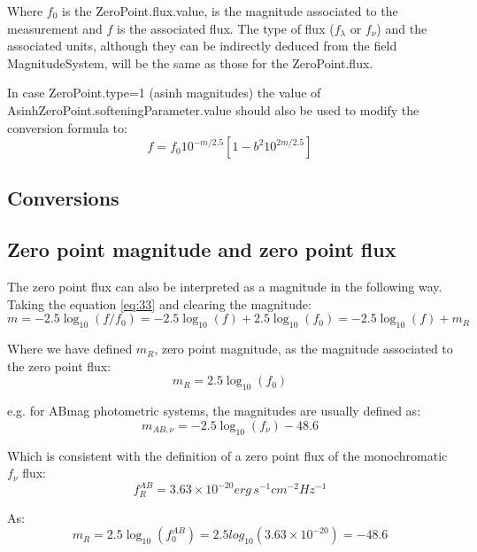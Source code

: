 \documentclass[11pt,a4paper]{ivoa}
\begin{document}
Where $f_0$ is the ZeroPoint.flux.value, is the magnitude associated to the 
measurement and $f$ is the associated flux. The type of flux ($f_\lambda $ or $f_\nu $) 
and the associated units, although they can be indirectly deduced from the field 
MagnitudeSystem, will be the same as those for the ZeroPoint.flux.
\par
In case ZeroPoint.type=1 (asinh magnitudes) the value of 
AsinhZeroPoint.softeningParameter.value should also be used to modify the conversion 
formula to:
\begin{equation} \label{eq:34}
f = f_0 10^{-m/2.5}\left[ 1 - b^2 10^{2m/2.5}\right]
\end{equation}

\begin{appendices}
\section{Conversions}
\subsection{Zero point magnitude and zero point flux} \label{a.1conversion}
The zero point flux can also be interpreted as a magnitude in the following way. 
Taking the equation \ref{eq:33} and clearing the magnitude:
\begin{equation} \label{eq:35}
m=-2.5\log_{10}(f/f_0 )=-2.5\log_{10}(f)+2.5\log_{10}(f_0 )=-2.5\log_{10} (f)+m_R
\end{equation}

Where we have defined $m_R$, zero point magnitude, as the magnitude associated to 
the zero point flux:
\begin{equation} \label{eq:36}
m_R = 2.5\log_{10} (f_0 )
\end{equation}

e.g. for ABmag photometric systems, the magnitudes are usually defined as:
\begin{equation} \label{eq:37}
m_{AB,\nu } = -2.5\log_{10} (f_\nu ) - 48.6
\end{equation}

Which is consistent with the definition of a zero point flux of the 
monochromatic $f_\nu $ flux:
\begin{equation} \label{eq:38}
f_{R}^{AB}=3.63 \times 10^{-20} erg\, s^{-1} cm^{-2} Hz^{-1}
\end{equation}

As:
\begin{equation} \label{eq:39}
m_R = 2.5\log_{10} (f_{0}^{AB})=2.5 log_10(3.63\times 10^{-20})=-48.6
\end{equation}


\end{appendices}
\end{document}
